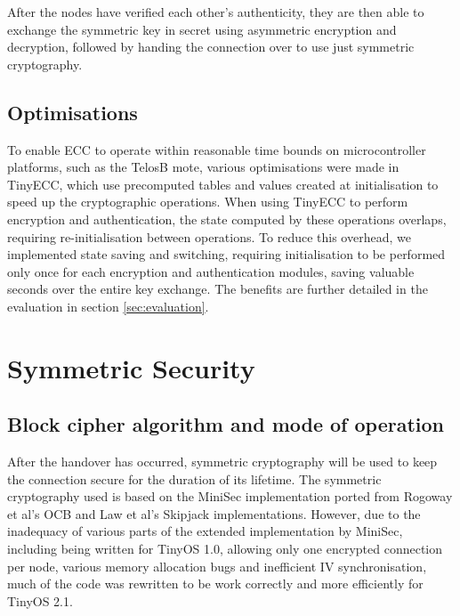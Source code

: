 \documentclass[conference]{./sty/IEEEtran}
\begin{document}
After the nodes have verified each other's authenticity, they are then able to exchange the symmetric key in secret using asymmetric encryption and decryption, followed by handing the connection over to use just symmetric cryptography. 

\subsection{Optimisations} %
\label{sub:optimisations}

To enable ECC to operate within reasonable time bounds on microcontroller platforms, such as the TelosB mote, various optimisations were made in TinyECC, which use precomputed tables and values created at initialisation to speed up the cryptographic operations. When using TinyECC to perform encryption and authentication, the state computed by these operations overlaps, requiring re-initialisation between operations. To reduce this overhead, we implemented state saving and switching, requiring initialisation to be performed only once for each encryption and authentication modules, saving valuable seconds over the entire key exchange. The benefits are further detailed in the evaluation in section \ref{sec:evaluation}.

\section{Symmetric Security} %
\label{sec:symmetric_security}
\subsection{Block cipher algorithm and mode of operation} %
\label{sub:cipher_block_algorithm_and_mode_of_operation}
After the handover has occurred, symmetric cryptography will be used to keep the connection secure for the duration of its lifetime. The symmetric cryptography used is based on the MiniSec implementation ported from Rogoway et al's OCB\cite{OCB} and Law et al's Skipjack\cite{Skipjack} implementations. However, due to the inadequacy of various parts of the extended implementation by MiniSec\cite{MiniSecLink}, including being written for TinyOS 1.0, allowing only one encrypted connection per node, various memory allocation bugs and inefficient IV synchronisation, much of the code was rewritten to be work correctly and more efficiently for TinyOS 2.1. 
\end{document}
